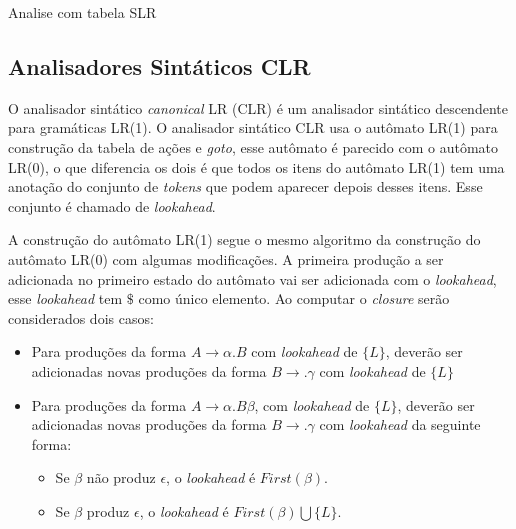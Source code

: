 \begin{algorithm}[htp]
    \caption{Analise com tabela SLR}\label{alg:slrparsing}
\end{algorithm}
\FloatBarrier

\subsection{Analisadores Sintáticos CLR}
O analisador sintático \textit{canonical} LR (CLR) é um analisador sintático descendente para gramáticas LR(1). O analisador sintático CLR usa o autômato LR(1) para construção da tabela de ações e \textit{goto}, esse autômato é parecido com o autômato LR(0), o que diferencia os dois é que todos os itens do autômato LR(1) tem uma anotação do conjunto de \textit{tokens} que podem aparecer depois desses itens. Esse conjunto é chamado de \textit{lookahead}. 

A construção do autômato LR(1) segue o mesmo algoritmo da construção do autômato LR(0) com algumas modificações. A primeira produção a ser adicionada no primeiro estado do autômato vai ser adicionada com o \textit{lookahead}, esse \textit{lookahead} tem $\$$ como único elemento. Ao computar o \textit{closure} serão considerados dois casos:
\begin{itemize}[label=$\sbullet$]
    \item Para produções da forma $A \rightarrow \alpha . B $ com \textit{lookahead} de $\{L\}$, deverão ser adicionadas novas produções da forma $B \rightarrow . \gamma$ com \textit{lookahead} de $\{L\}$
    \item Para produções da forma $A \rightarrow \alpha.B\beta$, com \textit{lookahead} de $\{L\}$, deverão ser adicionadas novas produções da forma $B \rightarrow . \gamma$ com \textit{lookahead} da seguinte forma:
    \begin{itemize}
        \item Se $\beta$ não produz $\epsilon$, o \textit{lookahead} é $First(\beta)$.
        \item Se $\beta$ produz $\epsilon$, o \textit{lookahead} é $First(\beta)\bigcup\{L\}$.
    \end{itemize}
\end{itemize}